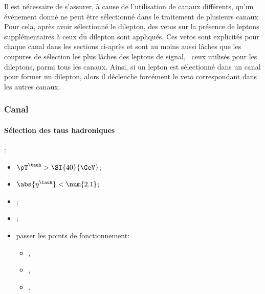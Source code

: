\par
Il est nécessaire de s'assurer, à cause de l'utilisation de canaux différents, qu'un événement donné ne peut être sélectionné dans le traitement de plusieurs canaux.
Pour cela, après avoir sélectionné le dilepton, des vetos sur la présence de leptons supplémentaires à ceux du dilepton sont appliqués.
Ces vetos sont explicités pour chaque canal dans les sections ci-après et sont au moins aussi lâches que les coupures de sélection les plus lâches des leptons de signal, \ie\ ceux utilisés pour les dileptons, parmi tous les canaux.
Ainsi, si un lepton est sélectionné dans un canal pour former un dilepton, alors il déclenche forcément le veto correspondant dans les autres canaux.

\subsubsection{Canal \tauh\tauh}\label{chapter-HTT_analysis-section-offline-tt}
\paragraph{Sélection des taus hadroniques}
:
\begin{itemize}
    \item $\pT^{\tauh} > \SI{40}{\GeV}$;
    \item $\abs{\eta^{\tauh}} < \num{2.1}$;
    \item \TauHdz;
    \item \NewDecayModeFinding[footnote];
    \item passer les points de fonctionnement:
        \begin{itemize}
            \item {},
            \item {},
            \item {}.
        \end{itemize}
\end{itemize}
